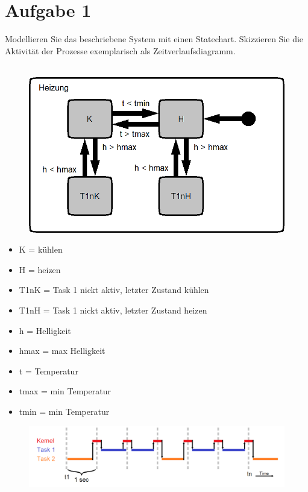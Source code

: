 \section{Aufgabe 1}
Modellieren Sie das beschriebene System mit einen Statechart. Skizzieren Sie die Aktivität der Prozesse exemplarisch als Zeitverlaufsdiagramm.\\ \\
\begin{figure}[h!]
	\centering
	\includegraphics[width=0.7\linewidth]{images/Statechart}
\end{figure}
\begin{itemize}
	\item K = kühlen
	\item H = heizen
	\item T1nK = Task 1 nickt aktiv, letzter Zustand kühlen
	\item T1nH = Task 1 nickt aktiv, letzter Zustand heizen
	\item h = Helligkeit
	\item hmax = max Helligkeit
	\item t = Temperatur
	\item tmax = min Temperatur
	\item tmin = min Temperatur
\end{itemize}
\begin{figure}[h!]
	\centering
	\includegraphics[width=0.7\linewidth]{images/Zeitverlaufsdiagramm}
\end{figure}

